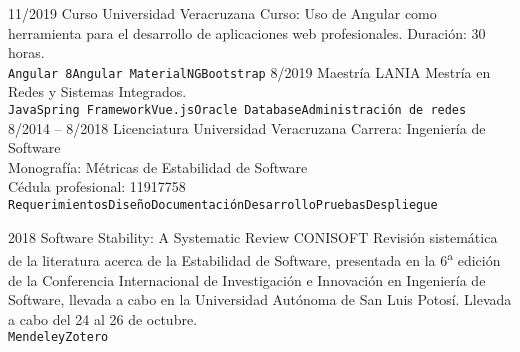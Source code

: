 \documentclass[9pt]{developercv} %
\begin{document}

\begin{entrylist}
	\entry
		{11/2019}
		{Curso}
		{Universidad Veracruzana}
        {Curso: Uso de Angular como herramienta para el desarrollo de aplicaciones web profesionales. Duración: 30 horas.\\
        \texttt{Angular 8}\slashsep\texttt{Angular Material}\slashsep\texttt{NGBootstrap}}
	\entry
		{8/2019}
		{Maestría}
		{LANIA}
        {Mestría en Redes y Sistemas Integrados.\\
        \texttt{Java}\slashsep\texttt{Spring Framework}\slashsep\texttt{Vue.js}\slashsep\texttt{Oracle Database}\slashsep\texttt{Administración de redes}}
	\entry
		{8/2014 -- 8/2018}
		{Licenciatura}
		{Universidad Veracruzana}
        {Carrera: Ingeniería de Software\\
        Monografía: Métricas de Estabilidad de Software\\
        Cédula profesional: 11917758\\
        \texttt{Requerimientos}\slashsep\texttt{Diseño}\slashsep\texttt{Documentación}\slashsep\texttt{Desarrollo}\slashsep\texttt{Pruebas}\slashsep\texttt{Despliegue}}
\end{entrylist}



\begin{entrylist}
	\entry
		{2018}
		{Software Stability: A Systematic Review}
		{CONISOFT}
        {Revisión sistemática de la literatura acerca de la Estabilidad de Software, presentada en la 6\textsuperscript{a} edición de la Conferencia Internacional de Investigación e Innovación en Ingeniería de Software, llevada a cabo en la Universidad Autónoma de San Luis Potosí. Llevada a cabo del 24 al 26 de octubre.\\
        \texttt{Mendeley}\slashsep\texttt{Zotero}}
\end{entrylist}



\end{document}
